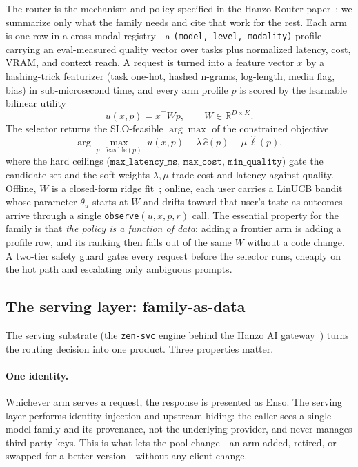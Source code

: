 \documentclass[11pt]{article}
\begin{document}
The router is the mechanism and policy specified in the Hanzo Router
paper~\cite{hanzorouterpaper}; we summarize only what the family needs and cite
that work for the rest. Each arm is one row in a cross-modal registry---a
\texttt{(model, level, modality)} profile carrying an eval-measured quality vector
over tasks plus normalized latency, cost, VRAM, and context reach. A request is
turned into a feature vector $x$ by a hashing-trick featurizer (task one-hot,
hashed n-grams, log-length, media flag, bias) in sub-microsecond time, and every
arm profile $p$ is scored by the learnable bilinear utility
\begin{equation}
u(x,p) = x^{\top} W p, \qquad W\in\mathbb{R}^{D\times K}.
\end{equation}
The selector returns the SLO-feasible $\arg\max$ of the constrained objective
\begin{equation}
\arg\max_{p\,:\,\mathrm{feasible}(p)}\; u(x,p) - \lambda\,\widehat{c}(p) - \mu\,\widehat{\ell}(p),
\end{equation}
where the hard ceilings ($\texttt{max\_latency\_ms}$, $\texttt{max\_cost}$,
$\texttt{min\_quality}$) gate the candidate set and the soft weights
$\lambda,\mu$ trade cost and latency against quality. Offline, $W$ is a closed-form
ridge fit~\cite{ridge}; online, each user carries a LinUCB bandit~\cite{linucb}
whose parameter $\theta_u$ starts at $W$ and drifts toward that user's taste as
outcomes arrive through a single \texttt{observe}$(u,x,p,r)$ call. The essential
property for the family is that \emph{the policy is a function of data}: adding a
frontier arm is adding a profile row, and its ranking then falls out of the same
$W$ without a code change. A two-tier safety guard gates every request before the
selector runs, cheaply on the hot path and escalating only ambiguous prompts.

\subsection{The serving layer: family-as-data}
\label{sec:serving}

The serving substrate (the \texttt{zen-svc} engine behind the Hanzo AI
gateway~\cite{hanzogateway}) turns the routing decision into one product. Three
properties matter.

\paragraph{One identity.} Whichever arm serves a request, the response is presented
as Enso. The serving layer performs identity injection and upstream-hiding: the
caller sees a single model family and its provenance, not the underlying provider,
and never manages third-party keys. This is what lets the pool change---an arm
added, retired, or swapped for a better version---without any client change.
\end{document}
